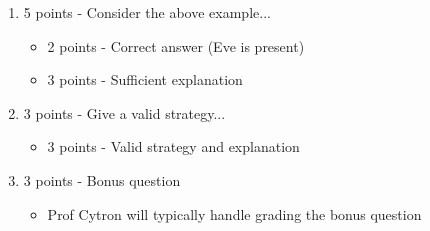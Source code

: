 \documentclass[12pt]{article}
\begin{document}
\begin{enumerate}[font=\bfseries]
    \item 5 points - Consider the above example...
        \begin{itemize}
            \item 2 points - Correct answer (Eve is present)
            \item 3 points - Sufficient explanation
        \end{itemize}
    \item 3 points - Give a valid strategy...
        \begin{itemize}
            \item 3 points - Valid strategy and explanation
        \end{itemize}
    \item 3 points - Bonus question
        \begin{itemize}
            \item Prof Cytron will typically handle grading the bonus question
        \end{itemize}
\end{enumerate}
\end{document}
